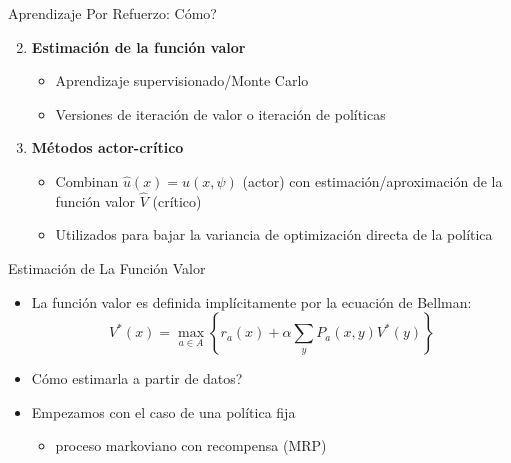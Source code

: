 \documentclass[handout]{beamer}
\begin{document}
\begin{frame}{Aprendizaje Por Refuerzo: Cómo?}
\begin{enumerate}
\setcounter{enumi}{1}
\item \textbf{Estimación de la función valor} 
\begin{itemize}
\item<2-> Aprendizaje supervisionado/Monte Carlo 
\item<3-> Versiones de iteración de valor o iteración de políticas
\end{itemize}
\item<4-> \textbf{Métodos actor-crítico}
\begin{itemize}
\item<5-> Combinan $\hat u(x) = u(x,\psi)$ (actor) con estimación/aproximación 
de la función valor $\hat V$ (crítico) 
\item<6-> Utilizados para bajar la variancia de optimización directa de la política
\end{itemize}
\end{enumerate}
\end{frame}


\begin{frame}{Estimación de La Función Valor}
\begin{itemize}
\item La función valor es definida implícitamente por la ecuación de Bellman:
$$V^*(x) =  \max\limits_{a \in A} \left\{r_a(x)+\alpha \sum_y P_a(x,y) V^*(y)\right\}$$
\item Cómo estimarla a partir de datos?
\item<2-> Empezamos con el caso de una política fija \begin{itemize} 
\item<3-> proceso markoviano con recompensa (MRP)
\end{itemize}
\end{itemize}  
\end{frame}
\end{document}
